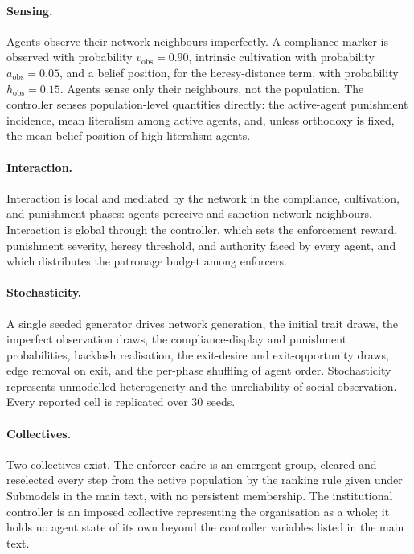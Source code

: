 \documentclass[12pt]{article}
\begin{document}
\paragraph{Sensing.} Agents observe their network neighbours imperfectly. A
compliance marker is observed with probability $v_{\mathrm{obs}}=0.90$,
intrinsic cultivation with probability $a_{\mathrm{obs}}=0.05$, and a belief
position, for the heresy-distance term, with probability
$h_{\mathrm{obs}}=0.15$. Agents sense only their neighbours, not the
population. The controller senses population-level quantities directly: the
active-agent punishment incidence, mean literalism among active agents, and,
unless orthodoxy is fixed, the mean belief position of high-literalism agents.

\paragraph{Interaction.} Interaction is local and mediated by the network in
the compliance, cultivation, and punishment phases: agents perceive and
sanction network neighbours. Interaction is global through the controller,
which sets the enforcement reward, punishment severity, heresy threshold, and
authority faced by every agent, and which distributes the patronage budget
among enforcers.

\paragraph{Stochasticity.} A single seeded generator drives network generation,
the initial trait draws, the imperfect observation draws, the
compliance-display and punishment probabilities, backlash realisation, the
exit-desire and exit-opportunity draws, edge removal on exit, and the per-phase
shuffling of agent order. Stochasticity represents unmodelled heterogeneity and
the unreliability of social observation. Every reported cell is replicated over
30 seeds.

\paragraph{Collectives.} Two collectives exist. The enforcer cadre is an
emergent group, cleared and reselected every step from the active population by
the ranking rule given under Submodels in the main text, with no persistent
membership. The institutional controller is an imposed collective representing
the organisation as a whole; it holds no agent state of its own beyond the
controller variables listed in the main text.
\end{document}
